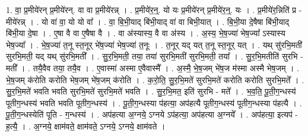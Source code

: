 \documentclass[17pt]{extarticle}
\begin{document}
1. वा॒ प्र॒मीये॑रन् प्र॒मीये॑रन्. वा वा प्र॒मीये॑रन्न् । . प्र॒मीये॑र॒न्॒. यो यः प्र॒मीये॑रन् प्र॒मीये॑र॒न्॒. यः । . प्र॒मीये॑र॒न्निति॑ प्र - मीये॑रन्न् । . यो वा॑ वा॒ यो यो वा᳚ । . वा॒ बि॒भी॒याद् बि॑भी॒याद् वा॑ वा बिभी॒यात् । . बि॒भी॒या दे॒षैषा बि॑भी॒याद् बि॑भी॒या दे॒षा । . ए॒षा वै वा ए॒षैषा वै । . वा अ॑स्यास्य॒ वै वा अ॑स्य । . अ॒स्य॒ भे॒ष॒ज्या॑ भेष॒ज्या᳚ ऽस्यास्य भेष॒ज्या᳚ । . भे॒ष॒ज्या॑ त॒नू स्त॒नूर् भे॑ष॒ज्या॑ भेष॒ज्या॑ त॒नूः । . त॒नूर् यद् यत् त॒नू स्त॒नूर् यत् । . यथ् सु॑रभि॒मती॑ सुरभि॒मती॒ यद् यथ् सु॑रभि॒मती᳚ । . सु॒र॒भि॒मती॒ तया॒ तया॑ सुरभि॒मती॑ सुरभि॒मती॒ तया᳚ । . सु॒र॒भि॒मतीति॑ सुरभि - मती᳚ । . तयै॒वैव तया॒ तयै॒व । . ए॒वास्मा॑ अस्मा ए॒वैवास्मै᳚ । . अ॒स्मै॒ भे॒ष॒जम् भे॑ष॒ज म॑स्मा अस्मै भेष॒जम् । . भे॒ष॒जम् क॑रोति करोति भेष॒जम् भे॑ष॒जम् क॑रोति । . क॒रो॒ति॒ सु॒र॒भि॒मते॑ सुरभि॒मते॑ करोति करोति सुरभि॒मते᳚ । . सु॒र॒भि॒मते॑ भवति भवति सुरभि॒मते॑ सुरभि॒मते॑ भवति । . सु॒र॒भि॒मत॒ इति॑ सुरभि - मते᳚ । . भ॒व॒ति॒ पू॒ती॒ग॒न्धस्य॑ पूतीग॒न्धस्य॑ भवति भवति पूतीग॒न्धस्य॑ । . पू॒ती॒ग॒न्धस्या प॑हत्या॒ अप॑हत्यै पूतीग॒न्धस्य॑ पूतीग॒न्धस्या प॑हत्यै । . पू॒ती॒ग॒न्धस्येति॑ पूति - ग॒न्धस्य॑ । . अप॑हत्या अ॒ग्नये॒ ऽग्नये ऽप॑हत्या॒ अप॑हत्या अ॒ग्नये᳚ । . अप॑हत्या॒ इत्यप॑ - ह॒त्यै॒ । . अ॒ग्नये॒ क्षाम॑वते॒ क्षाम॑वते॒ ऽग्नये॒ ऽग्नये॒ क्षाम॑वते । \newline
\end{document}
